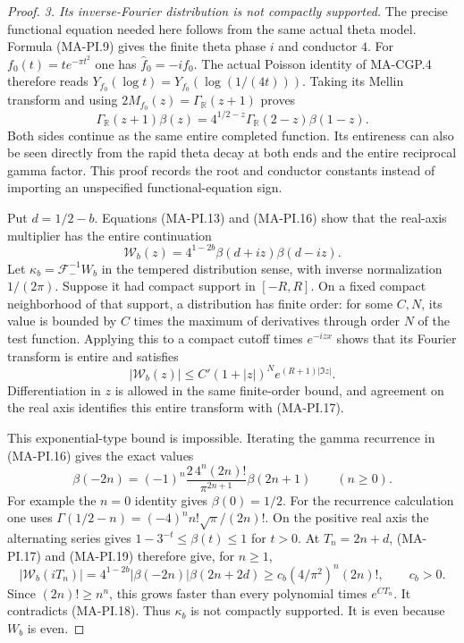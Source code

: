 \begin{proof}
\emph{3. Its inverse-Fourier distribution is not compactly supported.}
The precise functional equation needed here follows
from the same actual theta model.  Formula (MA-PI.9)
gives the finite theta phase $i$ and conductor $4$.
For $f_0(t)=t e^{-\pi t^2}$ one has
$\widehat f_0=-if_0$.  The actual Poisson identity
of MA-CGP.4 therefore reads
$Y_{f_0}(\log t)=Y_{f_0}(\log(1/(4t)))$.
Taking its Mellin transform and using
$2M_{f_0}(z)=\Gamma_{\mathbb R}(z+1)$ proves
\[
 \Gamma_{\mathbb R}(z+1)\beta(z)
       =4^{1/2-z}\Gamma_{\mathbb R}(2-z)\beta(1-z).
 \tag{MA-PI.16}
\]
Both sides continue as the same entire completed function.
Its entireness can also be seen directly from the rapid
theta decay at both ends and the entire reciprocal gamma
factor.  This proof records the root and conductor constants
instead of importing an unspecified functional-equation sign.

Put $d=1/2-b$.  Equations (MA-PI.13) and (MA-PI.16)
show that the real-axis multiplier has the entire continuation
\[
 \mathscr W_b(z)=4^{1-2b}\beta(d+iz)\beta(d-iz).
 \tag{MA-PI.17}
\]
Let $\kappa_b=\mathcal F_-^{-1}W_b$ in the tempered
distribution sense, with inverse normalization $1/(2\pi)$.
Suppose it had compact support in $[-R,R]$.  On a fixed
compact neighborhood of that support, a distribution
has finite order: for some $C,N$, its value is bounded
by $C$ times the maximum of derivatives through order
$N$ of the test function.  Applying this to a compact
cutoff times $e^{-izx}$ shows that its Fourier transform
is entire and satisfies
\[
 |\mathscr W_b(z)|\leq C'(1+|z|)^N e^{(R+1)|\Im z|}.
 \tag{MA-PI.18}
\]
Differentiation in $z$ is allowed in the same finite-order
bound, and agreement on the real axis identifies this
entire transform with (MA-PI.17).

This exponential-type bound is impossible.  Iterating
the gamma recurrence in (MA-PI.16) gives the exact values
\[
 \beta(-2n)=(-1)^n
        \frac{2\,4^n(2n)!}{\pi^{2n+1}}\beta(2n+1)
                  \qquad(n\geq0).
 \tag{MA-PI.19}
\]
For example the $n=0$ identity gives $\beta(0)=1/2$.
For the recurrence calculation one uses
$\Gamma(1/2-n)=(-4)^n n!\sqrt\pi/(2n)!$.
On the positive real axis the alternating series gives
$1-3^{-t}\leq\beta(t)\leq1$ for $t>0$.
At $T_n=2n+d$, (MA-PI.17) and (MA-PI.19) therefore give,
for $n\geq1$,
\[
 |\mathscr W_b(iT_n)|
    =4^{1-2b}|\beta(-2n)|\beta(2n+2d)
       \geq c_b(4/\pi^2)^n(2n)!,\qquad c_b>0.
 \tag{MA-PI.20}
\]
Since $(2n)!\geq n^n$, this grows faster than every
polynomial times $e^{C T_n}$.  It contradicts
(MA-PI.18).  Thus $\kappa_b$ is not compactly supported.
It is even because $W_b$ is even.


\end{proof}
